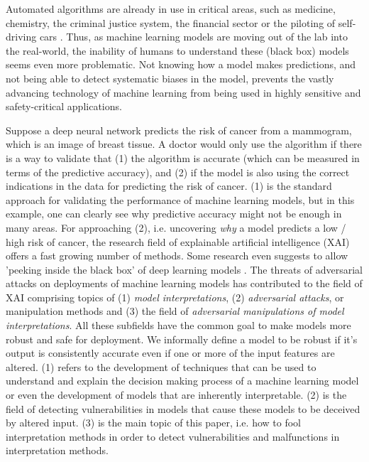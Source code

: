 Automated algorithms are already in use in critical areas, such as medicine, chemistry, the criminal justice system, the financial sector or the piloting of self-driving cars \cite{chouldechova2017fair, elshawi2019interpretability, whitmore2016mapping}. %
Thus, as machine learning models are moving out of the lab into the real-world, the inability of humans to understand these (black box) models seems even more problematic. Not knowing how a model makes predictions, and not being able to detect systematic biases in the model, prevents the vastly advancing technology of machine learning from being used in highly sensitive and safety-critical applications.  

Suppose a deep neural network predicts the risk of cancer from a mammogram, which is an image of breast tissue. A doctor would only use the algorithm if there is a way to validate that (1) the algorithm is accurate (which can be measured in terms of the predictive accuracy), and (2) if the model is also using the correct indications in the data for predicting the risk of cancer. (1) is the standard approach for validating the performance of machine learning models, but in this example, one can clearly see why predictive accuracy might not be enough in many areas. For approaching (2), i.e. uncovering \textit{why} a model predicts a low / high risk of cancer, the research field of explainable artificial intelligence (XAI) offers a fast growing number of methods. Some research even suggests to allow 'peeking inside the black box' of deep learning models \cite{adadi2018peeking}.  
The threats of adversarial attacks on deployments of machine learning models has contributed to the field of XAI comprising topics of (1) \textit{model interpretations}, (2) \textit{adversarial attacks}, or manipulation methods and (3) the field of \textit{adversarial manipulations of model interpretations}. All these subfields have the common goal to make models more robust and safe for deployment. We informally define a model to be robust if it's output is consistently accurate even if one or more of the input features are altered. 
(1) refers to the development of techniques that can be used to understand and explain the decision making process of a machine learning model or even the development of models that are inherently interpretable. (2) is the field of detecting vulnerabilities in models that cause these models to be deceived by altered input. 
(3) is the main topic of this paper, i.e. how to fool interpretation methods in order to detect vulnerabilities and malfunctions in interpretation methods. 
